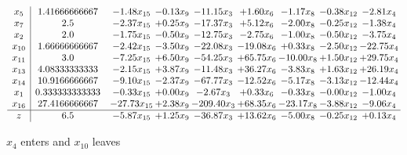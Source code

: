\documentclass[9pt]{article}
\begin{document}
 \[\begin{array}{c| c c@{\hskip 2pt} c@{\hskip 2pt} c@{\hskip 2pt} c@{\hskip 2pt} c@{\hskip 2pt} c@{\hskip 2pt} c@{\hskip 2pt} }
 x_{5}   &  1.41666666667 & -1.48 x_{15} & -0.13 x_{9} & -11.15 x_{3} & +  1.60 x_{6} & -1.17 x_{8} & -0.38 x_{12} & -2.81 x_{4}\\
 x_{7}   &  2.5 & -2.37 x_{15} & +  0.25 x_{9} & -17.37 x_{3} & +  5.12 x_{6} & -2.00 x_{8} & -0.25 x_{12} & -1.38 x_{4}\\
 x_{2}   &  2.0 & -1.75 x_{15} & -0.50 x_{9} & -12.75 x_{3} & -2.75 x_{6} & -1.00 x_{8} & -0.50 x_{12} & -3.75 x_{4}\\
 x_{10}   &  1.66666666667 & -2.42 x_{15} & -3.50 x_{9} & -22.08 x_{3} & -19.08 x_{6} & +  0.33 x_{8} & -2.50 x_{12} & -22.75 x_{4}\\
 x_{11}   &  3.0 & -7.25 x_{15} & +  6.50 x_{9} & -54.25 x_{3} & + 65.75 x_{6} & -10.00 x_{8} & +  1.50 x_{12} & + 29.75 x_{4}\\
 x_{13}   &  4.08333333333 & -2.15 x_{15} & +  3.87 x_{9} & -11.48 x_{3} & + 36.27 x_{6} & -3.83 x_{8} & +  1.63 x_{12} & + 26.19 x_{4}\\
 x_{14}   &  10.9166666667 & -9.10 x_{15} & -2.37 x_{9} & -67.77 x_{3} & -12.52 x_{6} & -5.17 x_{8} & -3.13 x_{12} & -12.44 x_{4}\\
 x_{1}   &  0.333333333333 & -0.33 x_{15} & +  0.00 x_{9} & -2.67 x_{3} & +  0.33 x_{6} & -0.33 x_{8} & -0.00 x_{12} & -1.00 x_{4}\\
 x_{16}   &  27.4166666667 & -27.73 x_{15} & +  2.38 x_{9} & -209.40 x_{3} & + 68.35 x_{6} & -23.17 x_{8} & -3.88 x_{12} & -9.06 x_{4}\\
\hline
z    &  6.5 & -5.87 x_{15} & +  1.25 x_{9} & -36.87 x_{3} & + 13.62 x_{6} & -5.00 x_{8} & -0.25 x_{12} & +  0.13 x_{4}\\
\end{array}\]


 $ x_{4} $ enters and $ x_{10} $ leaves 
\end{document}
